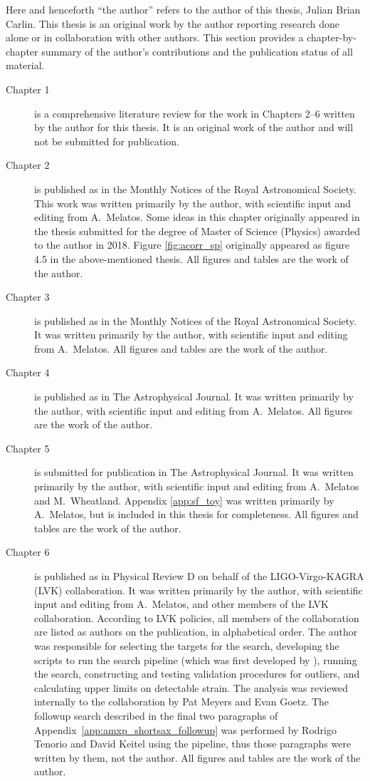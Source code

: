 Here and henceforth ``the author'' refers to the author of this thesis, Julian Brian Carlin. This thesis is an original work by the author reporting research done alone or in collaboration with other authors. 
This section provides a chapter-by-chapter summary of the author's contributions and the publication status of all material.

\begin{description}
  \item[Chapter 1] is a comprehensive literature review for the work in Chapters 2--6 written by the author for this thesis. It is an original work of the author and will not be submitted for publication.
  \item[Chapter 2] is published as \citet{Carlin2019ac} in the Monthly Notices of the Royal Astronomical Society. This work was written primarily by the author, with scientific input and editing from A.~Melatos. Some ideas in this chapter originally appeared in the thesis submitted for the degree of Master of Science (Physics) awarded to the author in 2018. Figure \ref{fig:acorr_sp} originally appeared as figure 4.5 in the above-mentioned thesis. All figures and tables are the work of the author.
  \item[Chapter 3] is published as \citet{Carlin2020bsa} in the Monthly Notices of the Royal Astronomical Society. It was written primarily by the author, with scientific input and editing from A.~Melatos. All figures and tables are the work of the author.
  \item[Chapter 4] is published as \citet{Carlin2021endog} in The Astrophysical Journal. It was written primarily by the author, with scientific input and editing from A.~Melatos. All figures are the work of the author.
  \item[Chapter 5] is submitted for publication in The Astrophysical Journal. It was written primarily by the author, with scientific input and editing from A.~Melatos and M.~Wheatland. Appendix \ref{app:sf_toy} was written primarily by A.~Melatos, but is included in this thesis for completeness. All figures and tables are the work of the author. 
  \item[Chapter 6] is published as \citet{o3amxp} in Physical Review D on behalf of the LIGO-Virgo-KAGRA (LVK) collaboration. It was written primarily by the author, with scientific input and editing from A.~Melatos, and other members of the LVK collaboration. According to LVK policies, all members of the collaboration are listed as authors on the publication, in alphabetical order. The author was responsible for selecting the targets for the search, developing the scripts to run the search pipeline (which was first developed by \citet{Suvorova2016, Suvorova2017}), running the search, constructing and testing validation procedures for outliers, and calculating upper limits on detectable strain. The analysis was reviewed internally to the collaboration by Pat Meyers and Evan Goetz. The followup search described in the final two paragraphs of Appendix~\ref{app:amxp_shortsax_followup} was performed by Rodrigo Tenorio and David Keitel using the {} pipeline, thus those paragraphs were written by them, not the author. All figures and tables are the work of the author.

\end{description}

